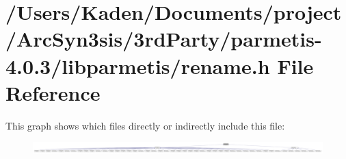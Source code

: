 \hypertarget{a00960}{}\section{/\+Users/\+Kaden/\+Documents/project/\+Arc\+Syn3sis/3rd\+Party/parmetis-\/4.0.3/libparmetis/rename.h File Reference}
\label{a00960}
This graph shows which files directly or indirectly include this file\+:\nopagebreak
\begin{figure}[H]
\begin{center}
\leavevmode
\includegraphics[width=350pt]{a00962}
\end{center}
\end{figure}
